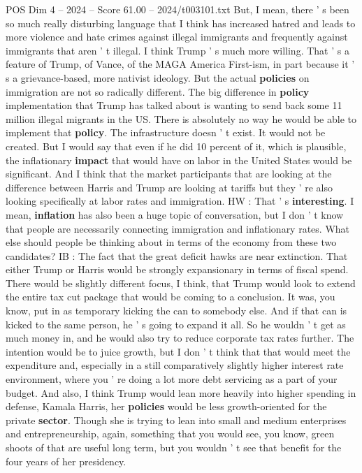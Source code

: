 \begin{textsample}{POS Dim 4 – 2024 – Score 61.00 – 2024/t003101.txt}
But, I mean, there ' s been so much really disturbing language that I think has increased hatred and leads to more violence and hate crimes against illegal immigrants and frequently against immigrants that aren ' t illegal.
I think Trump ' s much more willing.
That ' s a feature of Trump, of Vance, of the MAGA America First-ism, in part because it ' s a grievance-based, more nativist ideology.
But the actual \textbf{policies} on immigration are not so radically different.
The big difference in \textbf{policy} implementation that Trump has talked about is wanting to send back some 11 million illegal migrants in the US.
There is absolutely no way he would be able to implement that \textbf{policy}.
The infrastructure doesn ' t exist.
It would not be created.
But I would say that even if he did 10 percent of it, which is plausible, the inflationary \textbf{impact} that would have on labor in the United States would be significant.
And I think that the market participants that are looking at the difference between Harris and Trump are looking at tariffs but they ' re also looking specifically at labor rates and immigration.
HW : That ' s \textbf{interesting}.
I mean, \textbf{inflation} has also been a huge topic of conversation, but I don ' t know that people are necessarily connecting immigration and inflationary rates.
What else should people be thinking about in terms of the economy from these two candidates?
IB : The fact that the great deficit hawks are near extinction.
That either Trump or Harris would be strongly expansionary in terms of fiscal spend.
There would be slightly different focus, I think, that Trump would look to extend the entire tax cut package that would be coming to a conclusion.
It was, you know, put in as temporary kicking the can to somebody else.
And if that can is kicked to the same person, he ' s going to expand it all.
So he wouldn ' t get as much money in, and he would also try to reduce corporate tax rates further.
The intention would be to juice growth, but I don ' t think that that would meet the expenditure and, especially in a still comparatively slightly higher interest rate environment, where you ' re doing a lot more debt servicing as a part of your budget.
And also, I think Trump would lean more heavily into higher spending in defense, Kamala Harris, her \textbf{policies} would be less growth-oriented for the private \textbf{sector}.
Though she is trying to lean into small and medium enterprises and entrepreneurship, again, something that you would see, you know, green shoots of that are useful long term, but you wouldn ' t see that benefit for the four years of her presidency.

\end{textsample}
